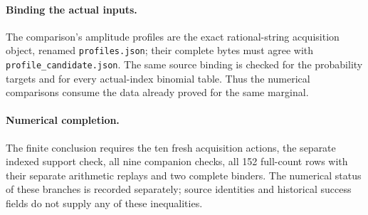 \paragraph{Binding the actual inputs.}
The comparison's amplitude profiles are the exact rational-string
acquisition object, renamed \texttt{profiles.json}; their complete bytes
must agree with \texttt{profile\_candidate.json}. The same source binding
is checked for the probability targets and for every actual-index
binomial table. Thus the numerical comparisons consume the data already
proved for the same marginal.

\paragraph{Numerical completion.}
The finite conclusion requires the ten fresh acquisition actions,
the separate indexed support check, all nine companion checks, all
152 full-count rows with their separate arithmetic replays and two
complete binders. The numerical
status of these branches is recorded separately; source identities and
historical success fields do not supply any of these inequalities.
